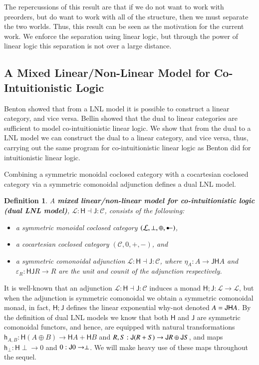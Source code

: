 \documentclass{lmcs}
\newtheorem{definition}[theorem]{Definition}
\let\mto\to
\let\to\relax
\newcommand{\to}{\rightarrow}
\let\j\relax
\let\wn\relax
\newcommand{\cat}[1]{\mathcal{#1}}
\newcommand{\func}[1]{\mathsf{#1}}
\newcommand{\colimp}[0]{\multimapdotinv}
\newcommand{\h}[1]{\mathsf{h}_{#1}}
\newcommand{\j}[1]{\mathsf{j}_{#1}}
\newcommand{\wn}[0]{\mathop{?}}
\begin{document}
The repercussions of this result are that if we do not want to work
with preorders, but do want to work with all of the structure, then we
must separate the two worlds.  Thus, this result can be seen as the
motivation for the current work.  We enforce the separation using
linear logic, but through the power of linear logic this separation is
not over a large distance.


\subsection{A Mixed Linear/Non-Linear Model for Co-Intuitionistic Logic}
\label{subsec:a_mixed_linear/non-linear_model_for_co-intuitionistic_logic}

Benton \cite{Benton:1994} showed that from a LNL model it is possible
to construct a linear category, and vice versa.  Bellin
\cite{Bellin:2012} showed that the dual to linear categories are
sufficient to model co-intuitionistic linear logic. We show that from
the dual to a LNL model we can construct the dual to a linear
category, and vice versa, thus, carrying out the same program for
co-intuitionistic linear logic as Benton did for intuitionistic linear
logic.

Combining a symmetric monoidal coclosed category with a cocartesian
coclosed category via a symmetric comonoidal adjunction defines a
dual LNL model.
\begin{definition}
  \label{def:dual LNL-model}
  A
  \textbf{mixed linear/non-linear model for co-intuitionistic logic (dual LNL model)},
  $\cat{L} : \func{H} \dashv \func{J} : \cat{C}$, consists of the following:
  \begin{itemize}
  \item[i.] a symmetric monoidal coclosed category $(\cat{L},\perp,\oplus,\colimp)$,
  \item[ii.] a cocartesian coclosed category $(\cat{C},0,+,-)$, and
  \item[iv.] a symmetric comonoidal adjunction $\cat{L} : \func{H}
    \dashv \func{J} : \cat{C}$, where $\eta_A : A \mto
    \func{JH}A$ and $\varepsilon_R : \func{HJ}R \mto R$
    are the unit and counit of the adjunction respectively.
  \end{itemize}
\end{definition}
It is well-known that an adjunction $\cat{L} : \func{H} \dashv
\func{J} : \cat{C}$ induces a monad $\func{H};\func{J} : \cat{L} \mto
\cat{L}$, but when the adjunction is symmetric comonoidal we obtain a
symmetric comonoidal monad, in fact, $\func{H};\func{J}$ defines the
linear exponential why-not denoted $\wn A = \func{JH}A$.
By the definition of dual LNL models we know that both $\func{H}$ and
$\func{J}$ are symmetric comonoidal functors, and hence, are equipped
with natural transformations $\h{A,B} : \func{H}(A \oplus B) \mto
\func{H}A + \func{H}B$ and $\j{R,S} : \func{J}(R + S) \mto \func{J}R
\oplus \func{J}S$, and maps $\h{\perp} : \func{H}\perp \mto 0$ and
$\j{0} : \func{J}0 \mto \perp$.  We will make heavy use of these
maps throughout the sequel.
\end{document}
